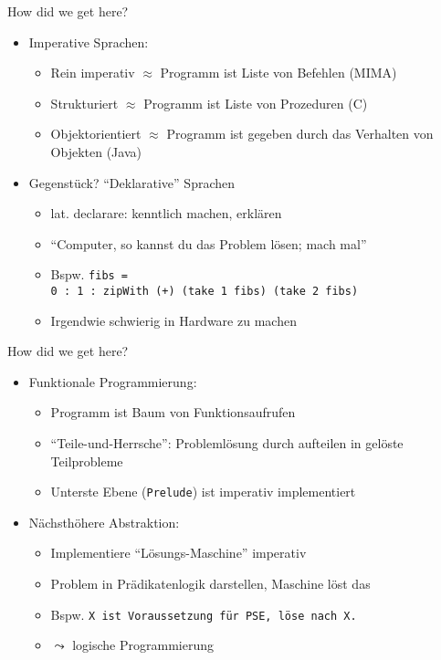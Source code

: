 \documentclass{beamer}
\begin{document}
\begin{frame}{How did we get here?}
	\begin{itemize}
		\item Imperative Sprachen:
		\begin{itemize}
			\item Rein imperativ $\approx$ Programm ist Liste von Befehlen (MIMA)
			\item Strukturiert $\approx$ Programm ist Liste von Prozeduren (C)
			\item Objektorientiert $\approx$ Programm ist gegeben durch das Verhalten von Objekten (Java)
		\end{itemize}
		\item Gegenstück? \pause \enquote{Deklarative} Sprachen
		\begin{itemize}
			\item lat. declarare: kenntlich machen, erklären
			\item \enquote{Computer, so kannst du das Problem lösen; mach mal}
			\item Bspw. \texttt{fibs =\\0 : 1 : zipWith (+) (take 1 fibs) (take 2 fibs)}
			\pause
			\item Irgendwie schwierig in Hardware zu machen
		\end{itemize}
	\end{itemize}
\end{frame}

\begin{frame}{How did we get here?}
	\begin{itemize}
		\item Funktionale Programmierung:
		\begin{itemize}
			\item Programm ist Baum von Funktionsaufrufen
			\item \enquote{Teile-und-Herrsche}: Problemlösung durch aufteilen in gelöste Teilprobleme
			\item Unterste Ebene (\texttt{Prelude}) ist imperativ implementiert
		\end{itemize}
		\pause
		\item Nächsthöhere Abstraktion:
		\begin{itemize}
			\item Implementiere \enquote{Lösungs-Maschine} imperativ
			\item Problem in Prädikatenlogik darstellen, Maschine löst das
			\item Bspw. \texttt{X ist Voraussetzung für PSE, löse nach X.}
			\item $\leadsto$ logische Programmierung
		\end{itemize}
	\end{itemize}
\end{frame}
\end{document}
